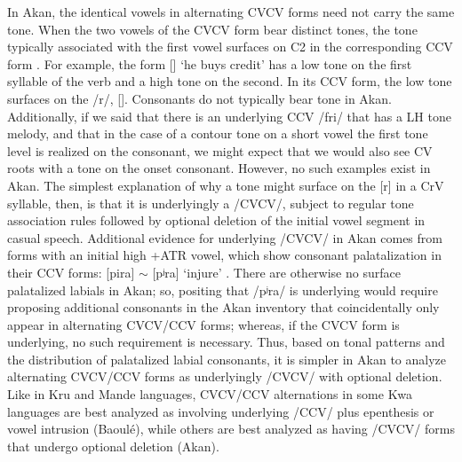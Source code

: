 \documentclass[output=paper,colorlinks,citecolor=brown]{langscibook}
\begin{document}
In Akan, the identical vowels in alternating CVCV forms need not carry the same tone. When the two vowels of the CVCV form bear distinct tones, the tone typically associated with the first vowel surfaces on C2 in the corresponding CCV form \citep{Dolphyne:1988}. For example, the form [{]} `he buys credit' has a low tone on the first syllable of the verb and a high tone on the second. In its CCV form, the low tone surfaces on the /r/, [{}]. Consonants do not typically bear tone in Akan. Additionally, if we said that there is an underlying CCV /fri/ that has a LH tone melody, and that in the case of a contour tone on a short vowel the first tone level is realized on the consonant, we might expect that we would also see CV roots with a tone on the onset consonant. However, no such examples exist in Akan. The simplest explanation of why a tone might surface on the [r] in a CrV syllable, then, is that it is underlyingly a /CVCV/, subject to regular tone association rules followed by optional deletion of the initial vowel segment in casual speech. Additional evidence for underlying /CVCV/ in Akan comes from forms with an initial high +ATR vowel, which show consonant palatalization in their CCV forms: [pira] $\sim$ [pʲra] `injure' \citep{Dolphyne:1988}. There are otherwise no surface palatalized labials in Akan; so, positing that /pʲra/ is underlying would require proposing additional consonants in the Akan inventory that coincidentally only appear in alternating CVCV\slash CCV forms; whereas, if the CVCV form is underlying, no such requirement is necessary. Thus, based on tonal patterns and the distribution of palatalized labial consonants, it is simpler in Akan to analyze alternating CVCV\slash CCV forms as underlyingly /CVCV/ with optional deletion. Like in Kru and Mande languages, CVCV\slash CCV alternations in some Kwa languages are best analyzed as involving underlying /CCV/ plus epenthesis or vowel intrusion (Baoulé), while others are best analyzed as having /CVCV/ forms that undergo optional deletion (Akan).
\end{document}
